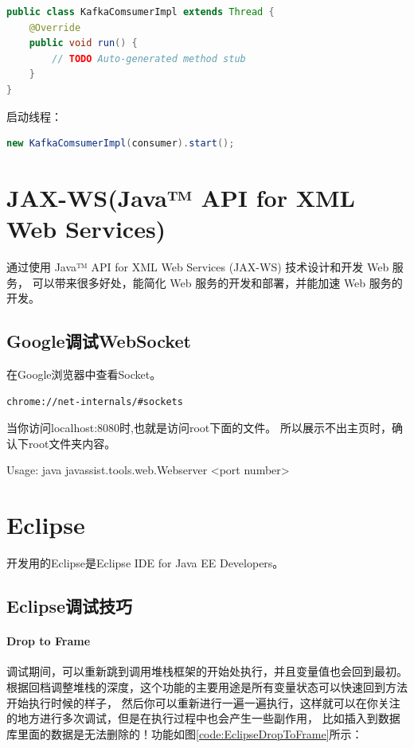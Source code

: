 \documentclass{book}
\begin{document}
\begin{lstlisting}[language=Java]
public class KafkaComsumerImpl extends Thread {
	@Override
	public void run() {
		// TODO Auto-generated method stub		
	}
}
\end{lstlisting}

启动线程：

\begin{lstlisting}[language=Java]
new KafkaComsumerImpl(consumer).start();
\end{lstlisting}


\section{JAX-WS(Java™ API for XML Web Services)}

通过使用 Java™ API for XML Web Services (JAX-WS) 技术设计和开发 Web 服务，
可以带来很多好处，能简化 Web 服务的开发和部署，并能加速 Web 服务的开发。

\subsection{Google调试WebSocket}

在Google浏览器中查看Socket。


\begin{lstlisting}[language=HTML]
chrome://net-internals/#sockets
\end{lstlisting}

当你访问localhost:8080时,也就是访问root下面的文件。
所以展示不出主页时，确认下root文件夹内容。

Usage: java javassist.tools.web.Webserver <port number>

\section{Eclipse}

开发用的Eclipse是Eclipse IDE for Java EE Developers。

\subsection{Eclipse调试技巧}

\paragraph{Drop to Frame}
调试期间，可以重新跳到调用堆栈框架的开始处执行，并且变量值也会回到最初。
根据回档调整堆栈的深度，这个功能的主要用途是所有变量状态可以快速回到方法开始执行时候的样子，
然后你可以重新进行一遍一遍执行，这样就可以在你关注的地方进行多次调试，但是在执行过程中也会产生一些副作用，
比如插入到数据库里面的数据是无法删除的！功能如图\ref{code:EclipseDropToFrame}所示：
\end{document}

